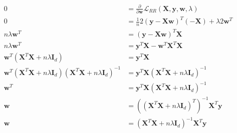 \newcommand{\matrix}[1]{\mathbf{#1}}
\newcommand{\vector}[1]{\mathbf{#1}}
\newcommand{\X}{\matrix{X}}
\newcommand{\y}{\vector{y}}
\newcommand{\w}{\vector{w}}
\begin{align*}
0 &= \frac{\partial}{\partial \w} \mathcal{L}_{RR} (\X,\y,\w,\lambda) \\
0 &= \frac{1}{n} 2(\y - \X\w)^T (-\X) + \lambda 2 \w^T \\
n \lambda \w^T &= (\y - \X\w)^T \X \\
n \lambda \w^T &= \y^T\X - \w^T\X^T\X \\
\w^T (\X^T\X + n \lambda \matrix{I}_d) &= \y^T\X \\
\w^T (\X^T\X + n \lambda \matrix{I}_d) (\X^T\X + n \lambda \matrix{I}_d)^{-1} &= \y^T\X (\X^T\X + n \lambda \matrix{I}_d)^{-1} \\
\w^T &= \y^T\X (\X^T\X + n \lambda \matrix{I}_d)^{-1} \\
\w &= ((\X^T\X + n \lambda \matrix{I}_d)^T)^{-1} \X^T\y \\
\w &= (\X^T\X + n \lambda \matrix{I}_d)^{-1} \X^T\y \\
\end{align*}
